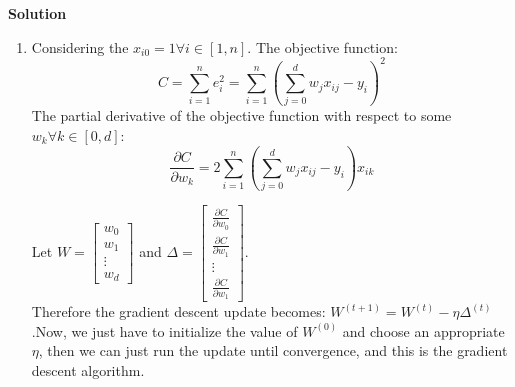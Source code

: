\documentclass[twoside]{article}
\begin{document}
\textbf{Solution}
\begin{enumerate}
    \item 
    Considering the $x_{i0} = 1 \forall i \in [1,n]$. The objective function:
    \begin{equation*}
        C = \sum_{i=1}^n e_i^2 = \sum_{i=1}^n \left(\sum_{j=0}^d w_j x_{ij} - y_i\right)^2
    \end{equation*}
    The partial derivative of the objective function with respect to some $w_k \forall k \in [0,d]$:
    \begin{equation*}
        \frac{\partial C}{\partial w_k} = 2\sum_{i=1}^n \left(\sum_{j=0}^d w_j x_{ij} - y_i\right)x_{ik}
    \end{equation*}

    Let $W = \begin{bmatrix} w_0\\w_1\\ \vdots\\ w_d \end{bmatrix}$ and $\Delta = \begin{bmatrix} \frac{\partial C}{\partial w_0}\\\frac{\partial C}{\partial w_1}\\ \vdots\\ \frac{\partial C}{\partial w_1} \end{bmatrix}$.\\
    Therefore the gradient descent update becomes: $W^{(t+1)} = W^{(t)} - \eta \Delta ^ {(t)}$.Now, we just have to initialize the value of $W^{(0)}$ and choose an appropriate $\eta$, then we can just run the update until convergence, and this is the gradient descent algorithm.
    

\end{enumerate}
\end{document}

